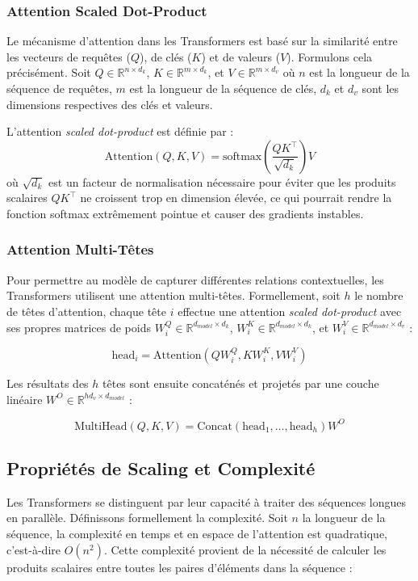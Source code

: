 \documentclass[13pt,a4paper]{article}
\begin{document}
\subsubsection{Attention Scaled Dot-Product}

Le mécanisme d'attention dans les Transformers est basé sur la similarité entre les vecteurs de requêtes ($Q$), de clés ($K$) et de valeurs ($V$). Formulons cela précisément. Soit $Q \in \mathbb{R}^{n \times d_k}$, $K \in \mathbb{R}^{m \times d_k}$, et $V \in \mathbb{R}^{m \times d_v}$ où $n$ est la longueur de la séquence de requêtes, $m$ est la longueur de la séquence de clés, $d_k$ et $d_v$ sont les dimensions respectives des clés et valeurs.

L'attention \textit{scaled dot-product} est définie par :
\[
\text{Attention}(Q, K, V) = \text{softmax}\left(\frac{QK^\top}{\sqrt{d_k}}\right)V
\]
où $\sqrt{d_k}$ est un facteur de normalisation nécessaire pour éviter que les produits scalaires $QK^\top$ ne croissent trop en dimension élevée, ce qui pourrait rendre la fonction softmax extrêmement pointue et causer des gradients instables.

\subsubsection{Attention Multi-Têtes}

Pour permettre au modèle de capturer différentes relations contextuelles, les Transformers utilisent une attention multi-têtes. Formellement, soit $h$ le nombre de têtes d'attention, chaque tête $i$ effectue une attention \textit{scaled dot-product} avec ses propres matrices de poids $W_i^Q \in \mathbb{R}^{d_{model} \times d_k}$, $W_i^K \in \mathbb{R}^{d_{model} \times d_k}$, et $W_i^V \in \mathbb{R}^{d_{model} \times d_v}$ :

\[
\text{head}_i = \text{Attention}(QW_i^Q, KW_i^K, VW_i^V)
\]

Les résultats des $h$ têtes sont ensuite concaténés et projetés par une couche linéaire $W^O \in \mathbb{R}^{hd_v \times d_{model}}$ :

\[
\text{MultiHead}(Q, K, V) = \text{Concat}(\text{head}_1, \dots, \text{head}_h)W^O
\]

\subsection{Propriétés de Scaling et Complexité}

Les Transformers se distinguent par leur capacité à traiter des séquences longues en parallèle. Définissons formellement la complexité. Soit $n$ la longueur de la séquence, la complexité en temps et en espace de l'attention est quadratique, c'est-à-dire $O(n^2)$. Cette complexité provient de la nécessité de calculer les produits scalaires entre toutes les paires d'éléments dans la séquence :
\end{document}
